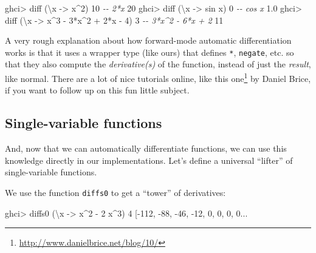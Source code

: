 \documentclass[]{article}
\newenvironment{Shaded}{}{}
\newcommand{\CommentTok}[1]{\textcolor[rgb]{0.38,0.63,0.69}{\textit{#1}}}
\newcommand{\DecValTok}[1]{\textcolor[rgb]{0.25,0.63,0.44}{#1}}
\newcommand{\FloatTok}[1]{\textcolor[rgb]{0.25,0.63,0.44}{#1}}
\newcommand{\FunctionTok}[1]{\textcolor[rgb]{0.02,0.16,0.49}{#1}}
\newcommand{\NormalTok}[1]{#1}
\newcommand{\OperatorTok}[1]{\textcolor[rgb]{0.40,0.40,0.40}{#1}}
\newcommand{\OtherTok}[1]{\textcolor[rgb]{0.00,0.44,0.13}{#1}}
\renewcommand{\href}[2]{#2\footnote{\url{#1}}}
\begin{document}
\begin{Shaded}
\begin{Highlighting}[]
\NormalTok{ghci}\OperatorTok{>}\NormalTok{ diff (\textbackslash{}x }\OtherTok{{-}>}\NormalTok{ x}\OperatorTok{\^{}}\DecValTok{2}\NormalTok{) }\DecValTok{10}       \CommentTok{{-}{-} 2*x}
\DecValTok{20}
\NormalTok{ghci}\OperatorTok{>}\NormalTok{ diff (\textbackslash{}x }\OtherTok{{-}>} \FunctionTok{sin}\NormalTok{ x) }\DecValTok{0}      \CommentTok{{-}{-} cos x}
\FloatTok{1.0}
\NormalTok{ghci}\OperatorTok{>}\NormalTok{ diff (\textbackslash{}x }\OtherTok{{-}>}\NormalTok{ x}\OperatorTok{\^{}}\DecValTok{3} \OperatorTok{{-}} \DecValTok{3}\OperatorTok{*}\NormalTok{x}\OperatorTok{\^{}}\DecValTok{2} \OperatorTok{+} \DecValTok{2}\OperatorTok{*}\NormalTok{x }\OperatorTok{{-}} \DecValTok{4}\NormalTok{) }\DecValTok{3}  \CommentTok{{-}{-} 3*x\^{}2 {-} 6*x + 2}
\DecValTok{11}
\end{Highlighting}
\end{Shaded}

A very rough explanation about how forward-mode automatic differentiation works
is that it uses a wrapper type (like ours) that defines \texttt{*},
\texttt{negate}, etc. so that they also compute the \emph{derivative(s)} of the
function, instead of just the \emph{result}, like normal. There are a lot of
nice tutorials online, like \href{http://www.danielbrice.net/blog/10/}{this one}
by Daniel Brice, if you want to follow up on this fun little subject.

\hypertarget{single-variable-functions}{%
\subsection{Single-variable functions}\label{single-variable-functions}}

And, now that we can automatically differentiate functions, we can use this
knowledge directly in our implementations. Let's define a universal ``lifter''
of single-variable functions.

We use the function \texttt{diffs0} to get a ``tower'' of derivatives:

\begin{Shaded}
\begin{Highlighting}[]
\NormalTok{ghci}\OperatorTok{>}\NormalTok{ diffs0 (\textbackslash{}x }\OtherTok{{-}>}\NormalTok{ x}\OperatorTok{\^{}}\DecValTok{2} \OperatorTok{{-}} \DecValTok{2}\NormalTok{ x}\OperatorTok{\^{}}\DecValTok{3}\NormalTok{) }\DecValTok{4}
\NormalTok{[}\OperatorTok{{-}}\DecValTok{112}\NormalTok{, }\OperatorTok{{-}}\DecValTok{88}\NormalTok{, }\OperatorTok{{-}}\DecValTok{46}\NormalTok{, }\OperatorTok{{-}}\DecValTok{12}\NormalTok{, }\DecValTok{0}\NormalTok{, }\DecValTok{0}\NormalTok{, }\DecValTok{0}\NormalTok{, }\DecValTok{0}\OperatorTok{...}
\end{Highlighting}
\end{Shaded}
\end{document}

